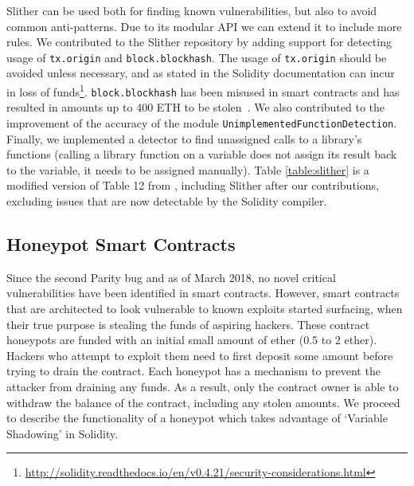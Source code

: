 Slither can be used both for finding known vulnerabilities, but also to avoid common anti-patterns. Due to its modular API we can extend it to include more rules. We contributed to the Slither repository by adding support for detecting usage of \texttt{tx.origin} and \texttt{block.blockhash}. The usage of \texttt{tx.origin} should be avoided unless necessary, and as stated in the Solidity documentation can incur in loss of funds\footnote{\url{http://solidity.readthedocs.io/en/v0.4.21/security-considerations.html}}. \texttt{block.blockhash} has been misused in smart contracts and has resulted in amounts up to 400 ETH to be stolen~\cite{smartbillions}. We also contributed to the improvement of the accuracy of the module \texttt{UnimplementedFunctionDetection}. Finally, we implemented a detector to find unassigned calls to a library's functions (calling a library function on a variable does not assign its result back to the variable, it needs to be assigned manually). Table \ref{table:slither} is a modified version of Table 12 from \cite{tools}, including Slither after our contributions, excluding issues that are now detectable by the Solidity compiler. %



\subsection{Honeypot Smart Contracts} \label{honeypots}
Since the second Parity bug and as of March 2018, no novel critical vulnerabilities have been identified in smart contracts. However, smart contracts that are architected to look vulnerable to known exploits started surfacing, when their true purpose is stealing the funds of aspiring hackers. These contract honeypots are funded with an initial small amount of ether (0.5 to 2 ether). Hackers who attempt to exploit them need to first deposit some amount before trying to drain the contract. Each honeypot has a mechanism to prevent the attacker from draining any funds. As a result, only the contract owner is able to withdraw the balance of the contract, including any stolen amounts. %
We proceed to describe the functionality of a honeypot which takes advantage of `Variable Shadowing' in Solidity. 

